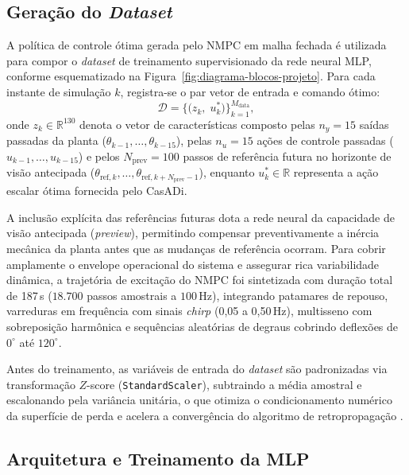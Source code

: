 \subsection{Geração do \textit{Dataset}}

A política de controle ótima gerada pelo NMPC em malha fechada é utilizada para compor o \textit{dataset} de treinamento supervisionado da rede neural MLP, conforme esquematizado na Figura~\ref{fig:diagrama-blocos-projeto}. Para cada instante de simulação $k$, registra-se o par vetor de entrada e comando ótimo:
\begin{equation}
    \mathcal{D} = \bigl\{
        \bigl(z_k,\; u_k^*\bigr)
    \bigr\}_{k=1}^{M_{\text{data}}},
    \label{eq:dataset}
\end{equation}
\noindent onde $z_k \in \mathbb{R}^{130}$ denota o vetor de características composto pelas $n_y = 15$ saídas passadas da planta ($\theta_{k-1}, \dots, \theta_{k-15}$), pelas $n_u = 15$ ações de controle passadas ($u_{k-1}, \dots, u_{k-15}$) e pelos $N_{\text{prev}} = 100$ passos de referência futura no horizonte de visão antecipada ($\theta_{\text{ref}, k}, \dots, \theta_{\text{ref}, k+N_{\text{prev}}-1}$), enquanto $u_k^* \in \mathbb{R}$ representa a ação escalar ótima fornecida pelo CasADi.

A inclusão explícita das referências futuras dota a rede neural da capacidade de visão antecipada (\textit{preview}), permitindo compensar preventivamente a inércia mecânica da planta antes que as mudanças de referência ocorram. Para cobrir amplamente o envelope operacional do sistema e assegurar rica variabilidade dinâmica, a trajetória de excitação do NMPC foi sintetizada com duração total de 187\,s ($18.700$ passos amostrais a $100$\,Hz), integrando patamares de repouso, varreduras em frequência com sinais \textit{chirp} (0,05 a 0,50\,Hz), multisseno com sobreposição harmônica e sequências aleatórias de degraus cobrindo deflexões de $0^\circ$ até $120^\circ$.

Antes do treinamento, as variáveis de entrada do \textit{dataset} são padronizadas via transformação $Z$-score (\texttt{StandardScaler}), subtraindo a média amostral e escalonando pela variância unitária, o que otimiza o condicionamento numérico da superfície de perda e acelera a convergência do algoritmo de retropropagação \cite{jiang2022}.

\subsection{Arquitetura e Treinamento da MLP}

